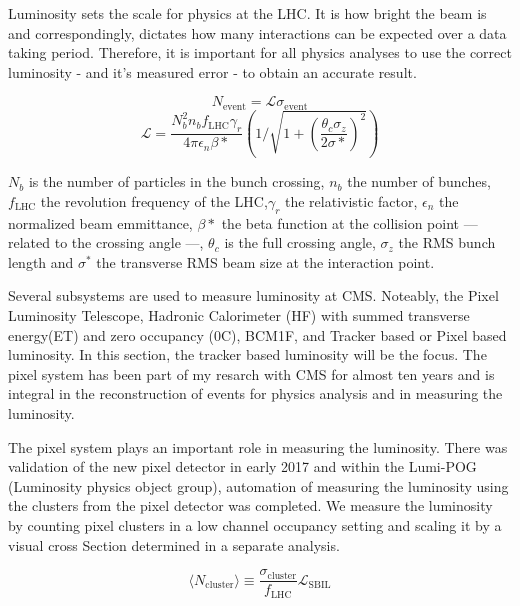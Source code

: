 Luminosity sets the scale for physics at the LHC. It is how bright the beam is and correspondingly, dictates how many interactions can be expected over a data taking period. Therefore, it is important for all physics analyses to use the correct luminosity - and it's measured error - to obtain an accurate result.  

\begin{equation}
N_{\text{event}} = \mathcal{L} \sigma_{\text{event}}
\end{equation}
\begin{equation}
\mathcal{L} = \frac{N_b^2 n_b f_\text{LHC} \gamma_r}{4\pi\epsilon_n \beta*}\left( 1 / \sqrt{1+ (\frac{\theta_c \sigma_z}{2\sigma*})^2} \right)
\end{equation}

$N_b$ is the number of particles in the bunch crossing, $n_b$ the number of bunches, $f_{\text{LHC}}$ the revolution frequency of the LHC,$\gamma_r$ the relativistic factor, $\epsilon_n$ the normalized beam emmittance, $\beta*$ the beta function at the collision point --- related to the crossing angle ---, $\theta_c$ is the full crossing angle, $\sigma_z$ the RMS bunch length and $\sigma^*$ the transverse RMS beam size at the interaction point.

Several subsystems are used to measure luminosity at CMS. Noteably, the Pixel Luminosity Telescope, Hadronic Calorimeter (HF) with summed transverse energy(ET) and zero occupancy (0C), BCM1F, and Tracker based or Pixel based luminosity.
In this section, the tracker based luminosity will be the focus. The pixel system has been part of my resarch with CMS for almost ten years and is integral in the reconstruction of events for physics analysis and in measuring the luminosity.


The pixel system plays an important role in measuring the luminosity. There was validation of the new pixel detector in early 2017 and within the Lumi-POG (Luminosity physics object group), automation of measuring the luminosity using the clusters from the pixel detector was completed. 
We measure the luminosity by counting pixel clusters in a low channel occupancy setting and scaling it by a visual cross Section determined in a separate analysis.

\begin{equation}
\langle N_{\text{cluster}}\rangle\equiv\frac{\sigma_{\text{cluster}}}{f_{\text{LHC}}}\mathcal{L}_{\text{SBIL}}
\end{equation}

